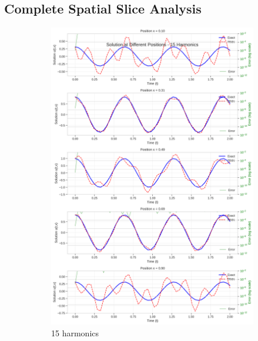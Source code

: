 \subsection{Complete Spatial Slice Analysis}

\begin{figure}[H]
    \centering
    \begin{subfigure}[b]{0.32\textwidth}
        \centering
        \includegraphics[width=\textwidth]{figures/space_slices_15h.png}
        \caption{15 harmonics}
    \end{subfigure}
    \hfill
    \begin{subfigure}[b]{0.32\textwidth}
        \centering

\end{subfigure}
\end{figure}
